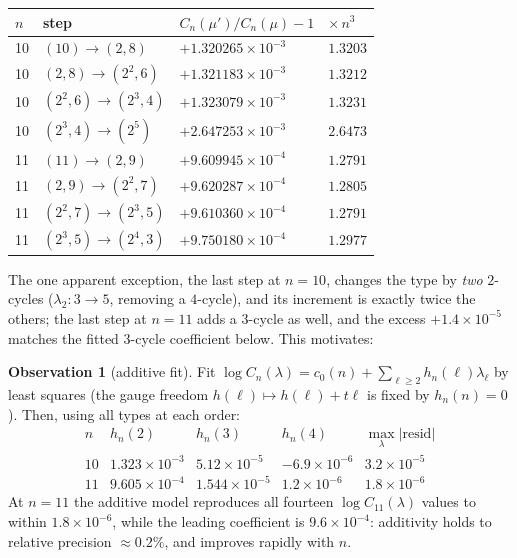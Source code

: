 \documentclass[11pt]{article}
\theoremstyle{definition}
\newtheorem{observation}[theorem]{Observation}
\newcommand{\CC}{C}
\begin{document}
\begin{center}
\small
\begin{tabular}{llll}
\toprule
$n$ & step & $\CC_n(\mu')/\CC_n(\mu)-1$ & $\times\,n^3$ \\
\midrule
10 & $(10)\to(2,8)$          & $+1.320265\times10^{-3}$ & $1.3203$\\
10 & $(2,8)\to(2^2,6)$       & $+1.321183\times10^{-3}$ & $1.3212$\\
10 & $(2^2,6)\to(2^3,4)$     & $+1.323079\times10^{-3}$ & $1.3231$\\
10 & $(2^3,4)\to(2^5)$       & $+2.647253\times10^{-3}$ & $2.6473$\\
11 & $(11)\to(2,9)$          & $+9.609945\times10^{-4}$ & $1.2791$\\
11 & $(2,9)\to(2^2,7)$       & $+9.620287\times10^{-4}$ & $1.2805$\\
11 & $(2^2,7)\to(2^3,5)$     & $+9.610360\times10^{-4}$ & $1.2791$\\
11 & $(2^3,5)\to(2^4,3)$     & $+9.750180\times10^{-4}$ & $1.2977$\\
\bottomrule
\end{tabular}
\end{center}

\noindent
The one apparent exception, the last step at $n=10$, changes the type by
\emph{two} $2$-cycles ($\lambda_2\colon 3\to5$, removing a $4$-cycle), and its
increment is exactly twice the others; the last step at $n=11$ adds a
$3$-cycle as well, and the excess $+1.4\times10^{-5}$ matches the fitted
$3$-cycle coefficient below.  This motivates:

\begin{observation}[additive fit]\label{obs:fit}
Fit $\log \CC_n(\lambda) = c_0(n)+\sum_{\ell\ge2} h_n(\ell)\lambda_\ell$ by
least squares (the gauge freedom $h(\ell)\mapsto h(\ell)+t\ell$ is fixed by
$h_n(n)=0$).  Then, using all types at each order:
\[
\begin{array}{l|lll|l}
n & h_n(2) & h_n(3) & h_n(4) & \max_\lambda|\mathrm{resid}| \\\hline
10 & 1.323\times10^{-3} & 5.12\times10^{-5} & -6.9\times10^{-6} & 3.2\times10^{-5}\\
11 & 9.605\times10^{-4} & 1.544\times10^{-5} & 1.2\times10^{-6} & 1.8\times10^{-6}
\end{array}
\]
At $n=11$ the additive model reproduces all fourteen $\log\CC_{11}(\lambda)$
values to within $1.8\times10^{-6}$, while the leading coefficient is
$9.6\times10^{-4}$: additivity holds to relative precision
$\approx 0.2\%$, and improves rapidly with $n$.
\end{observation}
\end{document}
